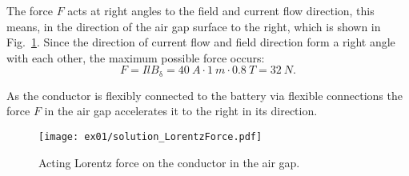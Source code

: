 
\begin{solutionblock}
    The force $F$ acts at right angles to the field and current flow direction, this means, in the direction of the air gap surface to the right, which is shown in Fig.~\ref{fig:solution_LorentzForce}. Since the direction of current flow and field direction form a right angle with each other, the maximum possible force occurs:
    \begin{equation}
        F = I l B_{\mathrm{\updelta}}
        = 40 \ \si{A} \cdot 1 \ \si{m} \cdot 0.8 \ \si{T}
        = 32 \ \si{N}.
    \end{equation}
    
    As the conductor is flexibly connected to the battery via flexible connections the force $F$ in the air gap accelerates it to the right in its direction.

    \begin{figure}[ht]
        \centering
        \texttt{[image: ex01/solution\_LorentzForce.pdf]}
        \caption{Acting Lorentz force on the conductor in the air gap.}
        \label{fig:solution_LorentzForce}
    \end{figure}

\end{solutionblock}




